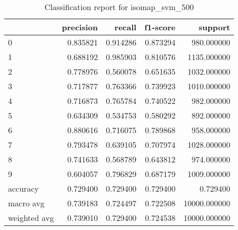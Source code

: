 \begin{table}[htb!]
\centering
\caption{Classification report for isomap_svm_500}
\label{tab:classification-report-isomap_svm_500}
\begin{tabular}{lrrrr}
\toprule
 & precision & recall & f1-score & support \\
\midrule
0 & 0.835821 & 0.914286 & 0.873294 & 980.000000 \\
1 & 0.688192 & 0.985903 & 0.810576 & 1135.000000 \\
2 & 0.778976 & 0.560078 & 0.651635 & 1032.000000 \\
3 & 0.717877 & 0.763366 & 0.739923 & 1010.000000 \\
4 & 0.716873 & 0.765784 & 0.740522 & 982.000000 \\
5 & 0.634309 & 0.534753 & 0.580292 & 892.000000 \\
6 & 0.880616 & 0.716075 & 0.789868 & 958.000000 \\
7 & 0.793478 & 0.639105 & 0.707974 & 1028.000000 \\
8 & 0.741633 & 0.568789 & 0.643812 & 974.000000 \\
9 & 0.604057 & 0.796829 & 0.687179 & 1009.000000 \\
accuracy & 0.729400 & 0.729400 & 0.729400 & 0.729400 \\
macro avg & 0.739183 & 0.724497 & 0.722508 & 10000.000000 \\
weighted avg & 0.739010 & 0.729400 & 0.724538 & 10000.000000 \\
\bottomrule
\end{tabular}
\end{table}
